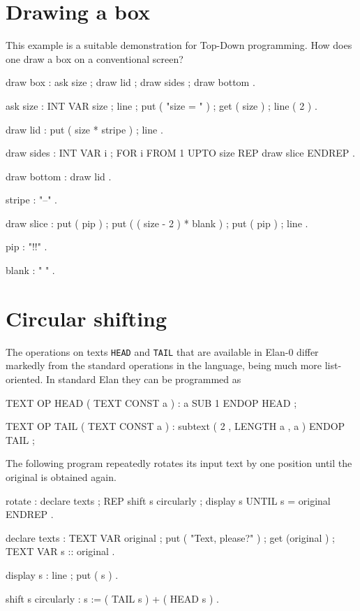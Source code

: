 \section{Drawing a box}

This example is a suitable demonstration for Top-Down programming.
How does one draw a box on a conventional screen?

\begin{elan}
draw box :
  ask size ;
  draw lid ;
  draw sides ;
  draw bottom .

ask size :
  INT VAR size ;
  line ;
  put ( "size = " ) ;
  get ( size ) ;
  line ( 2 ) .

draw lid :
  put ( size * stripe ) ;
  line .

draw sides :
  INT VAR i ;
  FOR i FROM 1 UPTO size
  REP draw slice
  ENDREP .

draw bottom : draw lid .

stripe : "--" .

draw slice :
  put ( pip ) ;
  put ( ( size - 2 ) * blank ) ;
  put ( pip ) ;
  line .

pip : "!!" .

blank : " " .
\end{elan}

\section{Circular shifting}

The operations on texts {\tt HEAD} and {\tt TAIL} that are available
in Elan-0 differ markedly from the standard operations in the
language, being much more list-oriented.
In standard Elan they can be programmed as

\begin{elan}
TEXT OP HEAD ( TEXT CONST a ) :
  a SUB 1
ENDOP HEAD ;

TEXT OP TAIL ( TEXT CONST a ) :
  subtext ( 2 , LENGTH a , a )
ENDOP TAIL ;
\end{elan}

\noindent
The following program repeatedly rotates its input text by one
position until the original is obtained again.

\begin{elan}
rotate :
  declare texts ;
  REP
    shift s circularly ;
    display s
  UNTIL
    s = original
  ENDREP .

declare texts :
  TEXT VAR original ;
  put ( "Text, please?" ) ;
  get (original ) ;
  TEXT VAR s :: original .

display s :
  line ;
  put ( s ) .

shift s circularly :
  s := ( TAIL s ) + ( HEAD s ) .
\end{elan}

